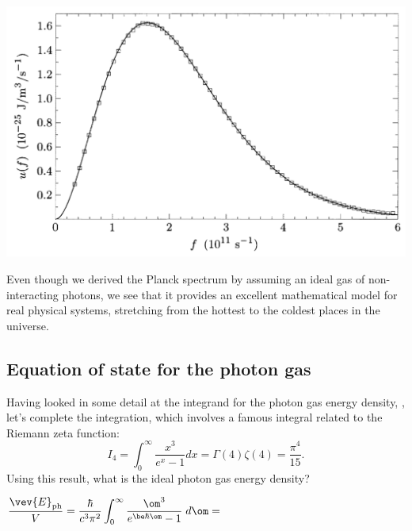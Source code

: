 \begin{center}\includegraphics[width=\textwidth]{figs/unit08_COBE.pdf}\end{center}

\begin{shaded}
  Even though we derived the Planck spectrum by assuming an ideal gas of non-interacting photons, we see that it provides an excellent mathematical model for real physical systems, stretching from the hottest to the coldest places in the universe.
\end{shaded}



\subsection{Equation of state for the photon gas}
Having looked in some detail at the integrand for the photon gas energy density, , let's complete the integration, which involves a famous integral related to the Riemann zeta function:
\begin{equation*}
  I_4 = \int_0^{\infty} \frac{x^3}{e^x - 1} dx = \Gamma(4) \zeta(4) = \frac{\pi^4}{15}.
\end{equation*}
Using this result, what is the ideal photon gas energy density?
\begin{mdframed}
  $\displaystyle \frac{\vev{E}_{\text{ph}}}{V} = \frac{\hbar}{c^3 \pi^2} \int_0^{\infty} \frac{\om^3}{e^{\be \hbar \om} - 1} \; d\om = $ \\[100 pt]
\end{mdframed}

